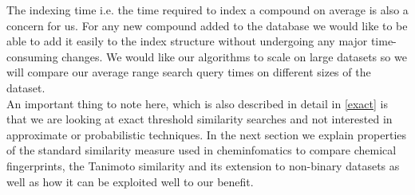 The indexing time i.e. the time required to index a compound on average is also a concern for us. For any new compound added to the database we would like to be able to add it easily to the index structure without undergoing any major time-consuming changes. We would like our algorithms to scale on large datasets so we will compare our average range search query times on different sizes of the dataset.\\

An important thing to note here, which is also described in detail in \autoref{exact} is that we are looking at exact threshold similarity searches and not interested in approximate or probabilistic techniques. In the next section we explain properties of the standard similarity measure used in cheminfomatics to compare chemical fingerprints, the Tanimoto similarity and its extension to non-binary datasets as well as how it can be exploited well to our benefit. \\
